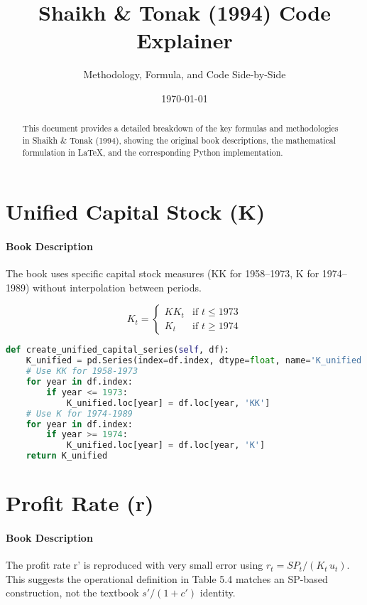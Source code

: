 \documentclass[12pt,a4paper]{article}
\title{Shaikh \& Tonak (1994) Code Explainer}
\author{Methodology, Formula, and Code Side-by-Side}
\date{\today}
\begin{document}
\maketitle

\begin{abstract}
This document provides a detailed breakdown of the key formulas and methodologies in Shaikh \& Tonak (1994), showing the original book descriptions, the mathematical formulation in LaTeX, and the corresponding Python implementation.
\end{abstract}

\section{Unified Capital Stock (K)}

\paragraph{Book Description} The book uses specific capital stock measures (KK for 1958--1973, K for 1974--1989) without interpolation between periods.

\begin{equation*}
K_t = \begin{cases}
KK_t & \text{if } t \leq 1973 \\
K_t & \text{if } t \geq 1974
\end{cases}
\end{equation*}

\begin{tcolorbox}[colback=gray!5!white,colframe=gray!60!black,title=Python Implementation]
\begin{lstlisting}[language=Python]
def create_unified_capital_series(self, df):
    K_unified = pd.Series(index=df.index, dtype=float, name='K_unified')
    # Use KK for 1958-1973
    for year in df.index:
        if year <= 1973:
            K_unified.loc[year] = df.loc[year, 'KK']
    # Use K for 1974-1989
    for year in df.index:
        if year >= 1974:
            K_unified.loc[year] = df.loc[year, 'K']
    return K_unified
\end{lstlisting}
\end{tcolorbox}

\section{Profit Rate (r)}

\paragraph{Book Description} The profit rate r' is reproduced with very small error using \( r_t = SP_t/(K_t\,u_t) \). This suggests the operational definition in Table 5.4 matches an SP-based construction, not the textbook \( s'/(1+c') \) identity.
\end{document}
